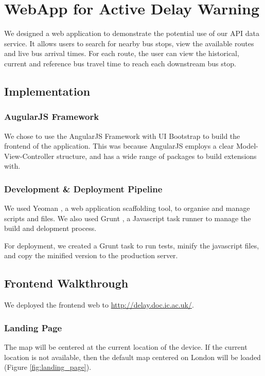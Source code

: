 \chapter{WebApp for Active Delay Warning}
\label{ch:mobile_app}

\par We designed a web application to demonstrate the potential use of our API data service. It allows users to search for nearby bus stops, view the available routes and live bus arrival times. For each route, the user can view the historical, current and reference bus travel time to reach each downstream bus stop.

\section{Implementation}
\subsection{AugularJS Framework}
\par We chose to use the AngularJS Framework \cite{angularjs} with UI Bootstrap \cite{bootstrap} to build the frontend of the application. This was because AngularJS employs a clear Model-View-Controller structure, and has a wide range of packages to build extensions with.

\subsection{Development \& Deployment Pipeline}
\par We used Yeoman \cite{yeoman}, a web application scaffolding tool, to organise and manage scripts and files. We also used Grunt \cite{grunt}, a Javascript task runner to manage the build and delopment process.

\par For deployment, we created a Grunt task to run tests, minify the javascript files, and copy the minified version to the production server.

\section{Frontend Walkthrough}
\par We deployed the frontend web to \url{http://delay.doc.ic.ac.uk/}.

\subsection{Landing Page}
\par The map will be centered at the current location of the device. If the current location is not available, then the default map centered on London will be loaded (Figure \ref{fig:landing_page}).

